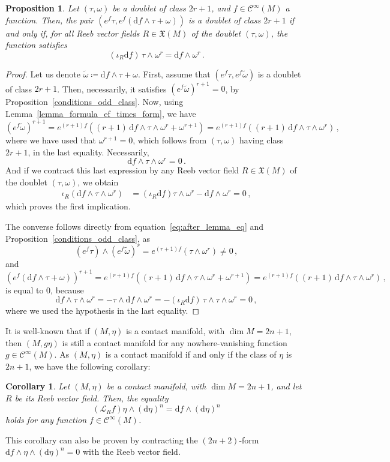 \documentclass[11pt,twoside]{article}
\theoremstyle{plain}
\newtheorem{proposition}[theorem]{Proposition}
\newtheorem{corollary}[theorem]{Corollary}
\theoremstyle{definition}
\renewcommand{\d}{\mathrm{d}}
\newcommand{\Cinfty}{\mathscr{C}^\infty}
\newcommand*{\inn}[1]{\iota_{#1}}
\newcommand{\Lie}{\mathscr{L}}
\newcommand{\X}{\mathfrak{X}}
\def\d{\mathrm{d}}
\def\X{\mathfrak{X}}
\def\d{\mathrm{d}}
\def\Lie{\mathscr{L}}
\begin{document}
\begin{proposition} 
    Let $(\tau,\omega)$ be a doublet of class $2r+1$, and $f\in\Cinfty(M)$ a function. Then, the pair $(e^f\tau, e^f(\d f\wedge \tau+\omega))$ is a doublet of class $2r+1$ if and only if, for all Reeb vector fields $R\in\X(M)$ of the doublet $(\tau,\omega)$, the function satisfies 
    \begin{equation}\label{maintain_odd_class}
        (\inn{R} \d f)\,\tau\wedge\omega^r = \d f\wedge \omega^r\,.
    \end{equation}
\end{proposition}
\begin{proof}
    Let us denote $\widetilde \omega\coloneqq \d f \wedge \tau +\omega$. First, assume that $(e^f\tau, e^f\widetilde \omega)$ is a doublet of class $2r+1$. Then, necessarily, it satisfies $(e^f\widetilde \omega)^{r+1}=0$, by Proposition~\ref{conditions_odd_class}. Now, using Lemma~\ref{lemma_formula_ef_times_form}, we have
    $$(e^f\widetilde \omega)^{r+1} = e^{(r+1)f}((r+1)\, \d f \wedge\tau\wedge\omega^{r}+\omega^{r+1}) = e^{(r+1)f}((r+1)\, \d f \wedge\tau\wedge \omega^{r})\,,$$
    where we have used that $\omega^{r+1}=0$, which follows from $(\tau,\omega)$ having class $2r+1$, in the last equality. Necessarily, 
    $$\d f\wedge\tau\wedge\omega^r=0\,.$$
    And if we contract this last expression by any Reeb vector field $R \in \X(M)$ of the doublet $(\tau,\omega)$, we obtain
    \begin{align}
        \inn{R}(\d f\wedge\tau\wedge\omega^r) &= (\inn{R}\d f)\tau\wedge\omega^r - \d f \wedge\omega^r=0\,,
    \end{align}
    which proves the first implication.

    The converse follows directly from equation~\eqref{eq:after_lemma_eq} and Proposition~\ref{conditions_odd_class}, as $$(e^f\tau)\wedge (e^f\widetilde\omega)^{r}=e^{(r+1)f}(\tau\wedge \omega ^r)\neq 0\,, $$ and
    $$(e^f(\d f\wedge \tau+\omega))^{r+1} = e^{(r+1)f}((r+1)\, \d f \wedge\tau\wedge\omega^{r}+\omega^{r+1}) = e^{(r+1)f}((r+1)\, \d f \wedge\tau\wedge \omega^{r})\,,$$
    is equal to 0, because
    $$\d f \wedge\tau\wedge\omega^{r}=-\tau\wedge\d f\wedge\omega^r=-(\inn{R}\d f)\, \tau\wedge\tau\wedge\omega^r = 0\,,$$
    where we used the hypothesis in the last equality.
\end{proof}

It is well-known that if $(M,\eta)$ is a contact manifold, with $\dim M = 2n+1$, then $(M,g\eta)$ is still a contact manifold for any nowhere-vanishing function $g\in \Cinfty(M)$. As $(M,\eta)$ is a contact manifold if and only if the class of $\eta$ is $2n+1$, we have the following corollary:
\begin{corollary}
    Let $(M,\eta)$ be a contact manifold, with $\dim M = 2n+1$, and let $R$ be its Reeb vector field. Then, the equality 
    $$(\Lie_R f)\eta\wedge (\d \eta )^n = \d f \wedge (\d \eta) ^n$$
    holds for any function $f \in \Cinfty (M)$.
\end{corollary}
This corollary can also be proven by contracting the $(2n+2)$-form $\d f\wedge \eta \wedge (\d \eta)^n=0$ with the Reeb vector field.
\end{document}

